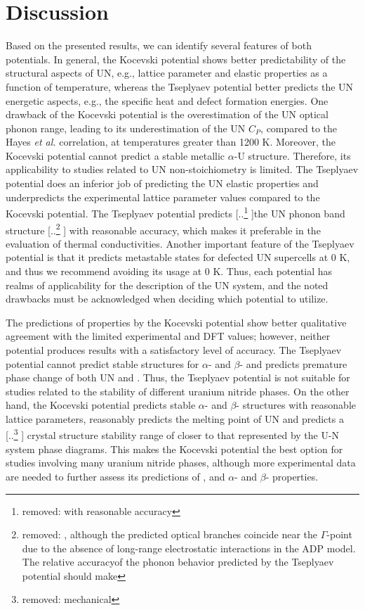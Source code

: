 \documentclass[preprint, 12pt]{elsarticle}
\providecommand{\DIFaddtex}[1]{{\protect\color{blue} \sf #1}} %
\providecommand{\DIFdeltex}[1]{{\protect\color{red} [..\footnote{removed: #1} ]}} %
\providecommand{\DIFaddbegin}{} %
\providecommand{\DIFaddend}{} %
\providecommand{\DIFdelbegin}{} %
\providecommand{\DIFdelend}{} %
\providecommand{\DIFadd}[1]{\texorpdfstring{\DIFaddtex{#1}}{#1}} %
\providecommand{\DIFdel}[1]{\texorpdfstring{\DIFdeltex{#1}}{}} %
\newcommand{\DIFscaledelfig}{0.5}
\newlength{\DIFdelgraphicswidth} %
\newlength{\DIFdelgraphicsheight} %
\newcommand{\DIFaddincludegraphics}[2][]{{\color{blue}\fbox{\DIFOincludegraphics[#1]{#2}}}} %
\newcommand{\DIFdelincludegraphics}[2][]{%
\sbox{\DIFdelgraphicsbox}{\DIFOincludegraphics[#1]{#2}}%
\settoboxwidth{\DIFdelgraphicswidth}{\DIFdelgraphicsbox} %
\settoboxtotalheight{\DIFdelgraphicsheight}{\DIFdelgraphicsbox} %
\scalebox{\DIFscaledelfig}{%
\parbox[b]{\DIFdelgraphicswidth}{\usebox{\DIFdelgraphicsbox}\\[-\baselineskip] \rule{\DIFdelgraphicswidth}{0em}}\llap{\resizebox{\DIFdelgraphicswidth}{\DIFdelgraphicsheight}{%
\setlength{\unitlength}{\DIFdelgraphicswidth}%
\begin{picture}(1,1)%
\thicklines\linethickness{2pt} %
{\color[rgb]{1,0,0}\put(0,0){\framebox(1,1){}}}%
{\color[rgb]{1,0,0}\put(0,0){\line( 1,1){1}}}%
{\color[rgb]{1,0,0}\put(0,1){\line(1,-1){1}}}%
\end{picture}%
}\hspace*{3pt}}} %
} %
\DeclareRobustCommand{\DIFaddbegin}{\DIFOaddbegin \let\includegraphics\DIFaddincludegraphics} %
\DeclareRobustCommand{\DIFaddend}{\DIFOaddend \let\includegraphics\DIFOincludegraphics} %
\DeclareRobustCommand{\DIFdelbegin}{\DIFOdelbegin \let\includegraphics\DIFdelincludegraphics} %
\DeclareRobustCommand{\DIFdelend}{\DIFOaddend \let\includegraphics\DIFOincludegraphics} %
\begin{document}
\section{Discussion}

Based on the presented results, we can identify several features of both potentials. In general, the Kocevski potential shows better predictability of the structural aspects of UN, e.g., lattice parameter and elastic properties as a function of temperature, whereas the Tseplyaev potential better predicts the UN energetic aspects, e.g., the specific heat and defect formation energies. One drawback of the Kocevski potential is the overestimation of the UN optical phonon range, leading to its underestimation of the UN $C_P$, compared to the Hayes \textit{et al.} \cite{Hayes1990IV} correlation, at temperatures greater than 1200 K. Moreover, the Kocevski potential cannot predict a stable metallic $\alpha$-U structure. Therefore, its applicability to studies related to UN non-stoichiometry is limited. The Tseplyaev potential does an inferior job of predicting the UN elastic properties and underpredicts the experimental lattice parameter values compared to the Kocevski potential. The Tseplyaev potential predicts \DIFdelbegin \DIFdel{with reasonable accuracy }\DIFdelend the UN phonon band structure \DIFdelbegin \DIFdel{, although the predicted optical branches coincide near the $\Gamma$-point due to the absence of long-range electrostatic interactions in the ADP model. The relative accuracyof the phonon behavior predicted by the Tseplyaev potential should make }\DIFdelend \DIFaddbegin \DIFadd{with reasonable accuracy, which makes }\DIFaddend it preferable in the evaluation of thermal conductivities. Another important feature of the Tseplyaev potential is that it predicts metastable states for defected UN supercells at 0 K, and thus we recommend avoiding its usage at 0 K. Thus, each potential has realms of applicability for the description of the UN system, and the noted drawbacks must be acknowledged when deciding which potential to utilize. 

The predictions of  properties by the Kocevski potential show better qualitative agreement with the limited experimental and DFT values; however, neither potential produces results with a satisfactory level of accuracy. The Tseplyaev potential cannot predict stable structures for $\alpha$- and $\beta$- and predicts premature phase change of both UN and . Thus, the Tseplyaev potential is not suitable for studies related to the stability of different uranium nitride phases. On the other hand, the Kocevski potential predicts stable $\alpha$- and $\beta$- structures with reasonable lattice parameters, reasonably predicts the melting point of UN and predicts a \DIFdelbegin \DIFdel{mechanical }\DIFdelend \DIFaddbegin \DIFadd{crystal structure }\DIFaddend stability range of  closer to that represented by the U-N system phase diagrams. This makes the Kocevski potential the best option for studies involving many uranium nitride phases, although more experimental data are needed to further assess its predictions of , and $\alpha$- and $\beta$- properties.
\end{document}

